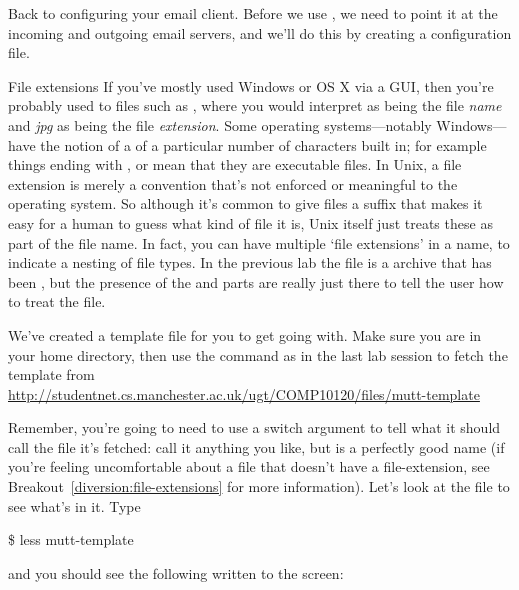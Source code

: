 Back to configuring your email client. Before we use , we need to point it at the incoming and outgoing email servers, and we'll do this by creating a configuration file.

\begin{diversion}{File extensions}
\label{diversion:file-extensions}
If you've mostly used Windows or OS X via a GUI, then you're probably used to files such as , where you would interpret  as being the file \textit{name} and \textit{jpg} as being the file \textit{extension}. Some operating systems---notably Windows---have the notion of a  of a particular number of characters built in; for example things ending with ,  or  mean that they are executable files. In Unix, a file extension is merely a convention that's not enforced or meaningful to the operating system. So although it's common to give files a suffix that makes it easy for a human to guess what kind of file it is, Unix itself just treats these as part of the file name. In fact, you can have multiple `file extensions' in a name, to indicate a nesting of file types. In the previous lab the file  is a  archive that has been , but the presence of the  and  parts are really just there to tell the user how to treat the file.
\end{diversion}

We've created a template file for you to get going with. Make sure you are in your home directory, then use the  command as in the last lab session to fetch the template from  \\
\url{http://studentnet.cs.manchester.ac.uk/ugt/COMP10120/files/mutt-template}


Remember, you're going to need to use a switch argument to tell  what it should call the file it's fetched: call it anything you like, but  is a perfectly good name (if you're feeling uncomfortable about a file that doesn't have a file-extension, see Breakout~\ref{diversion:file-extensions} for more information). Let's look at the file to see what's in it. Type

\begin{ttoutenv}
\$ less mutt-template
\end{ttoutenv}

\enlargethispage{\baselineskip}
and you should see the following written to the screen:
\begin{ttoutenv}

\end{ttoutenv}

